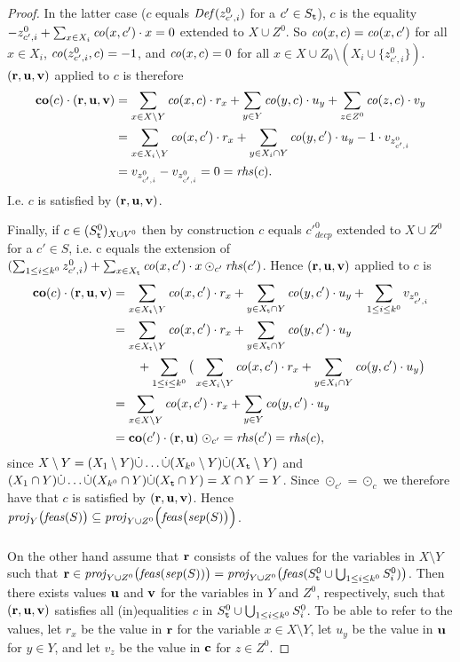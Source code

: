 \begin{proof}
In the latter case ($c$ equals $\mathit{Def}(z^0_{c',i})$ for a $c'\in S_{\texttt{t}}$), $c$ is the equality $-z^0_{c',i} + \sum_{x\in X_i}\mathit{co}(x,c')\cdot x = 0$ extended to $X\cup Z^0$. 
So $\mathit{co}(x,c) = \mathit{co}(x,c')$ for all $x\in X_i$, $\mathit{co}(z^0_{c',i}, c) = -1$, and $\mathit{co}(x,c) = 0$ for all $x\in X\cup Z_0\setminus (X_i\cup\{z^0_{c',i}\})$.
$(\mathbf{r},\mathbf{u},\mathbf{v})$ applied to $c$ is therefore
\begin{align*}
\mathbf{co}(c)\cdot(\mathbf{r},\mathbf{u},\mathbf{v})&=\sum_{x\in X\setminus Y}\mathit{co}(x,c)\cdot r_x + \sum_{y\in Y}\mathit{co}(y,c)\cdot u_y + \sum_{z\in Z^0}\mathit{co}(z,c)\cdot v_y\\
&= \sum_{x\in X_i\setminus Y}\mathit{co}(x,c')\cdot r_x + \sum_{y\in X_i\cap Y}\mathit{co}(y,c')\cdot u_y 
 -1\cdot v_{z^0_{c',i}}\\
&= v_{z^0_{c',i}} - v_{z^0_{c',i}} = 0 = \mathit{rhs}(c).
\end{align*}
I.e. $c$ is satisfied by $(\mathbf{r},\mathbf{u}, \mathbf{v})$. 

Finally, if $c\in (S^0_{\texttt{t}})_{X\cup V^0}$ then by construction $c$ equals $c'^0_{decp}$ extended to $X\cup Z^0$ for a $c'\in S$, i.e. c equals the extension of $(\sum_{1\leq i\leq k^0}z^0_{c',i}) + \sum_{x\in X_{\texttt{t}}}\mathit{co}(x,c')\cdot x\odot_{c'}\mathit{rhs}(c')$. Hence $(\mathbf{r},\mathbf{u}, \mathbf{v})$ applied to $c$ is
\begin{align*}
\mathbf{co}(c)\cdot(\mathbf{r},\mathbf{u}, \mathbf{v})
&= \sum_{x\in X_{\texttt{t}}\setminus Y}\mathit{co}(x,c')\cdot r_x + \sum_{y\in X_{\texttt{t}}\cap Y}\mathit{co}(y,c')\cdot u_y 
 +\sum_{1\leq i\leq k^0} v_{z^0_{c',i}}\\
&= \sum_{x\in X_{\texttt{t}}\setminus Y}\mathit{co}(x,c')\cdot r_x + \sum_{y\in X_{\texttt{t}}\cap Y}\mathit{co}(y,c')\cdot u_y\\ 
&\quad\quad + \sum_{1\leq i\leq k^0}\big(\sum_{x\in X_i\setminus Y}\mathit{co}(x,c')\cdot r_x + \sum_{y\in X_i\cap Y}\mathit{co}(y,c')\cdot u_y\big)\\
&= \sum_{x\in X\setminus Y}\mathit{co}(x,c')\cdot r_x + \sum_{y\in Y}\mathit{co}(y,c')\cdot u_y\\
&=\mathbf{co}(c')\cdot(\mathbf{r},\mathbf{u})\; \odot_{c'}= \mathit{rhs}(c') = \mathit{rhs}(c),
\end{align*}
since $X\setminus Y = (X_1\setminus Y)\dot\cup \ldots\dot\cup (X_{k^0}\setminus Y)\dot\cup (X_{\texttt{t}}\setminus Y)$ and
$(X_1\cap Y)\dot\cup \ldots\dot\cup (X_{k^0}\cap Y)\dot\cup (X_{\texttt{t}}\cap Y) = X\cap Y = Y$. Since $\odot_{c'}=\odot_c$ 
we therefore have that $c$ is satisfied by $(\mathbf{r},\mathbf{u}, \mathbf{v})$. Hence $\mathit{proj}_Y\big(\mathit{feas}(S)\big)\subseteq \mathit{proj}_{Y\cup Z^0}\Big(\mathit{feas}\big(\mathit{sep}(S)\big)\Big)$.
\\\\
On the other hand assume that $\mathbf{r}$ consists of the values for the variables in $X\setminus Y$ such that $\mathbf{r}\in \mathit{proj}_{Y\cup Z^0}\big(\mathit{feas}(\mathit{sep}(S))\big)=\mathit{proj}_{Y\cup Z^0}\big(\mathit{feas}(S^0_{\texttt{t}}\cup\bigcup_{1\leq i\leq k^0} S^0_i)\big)$. Then there exists values $\mathbf{u}$ and $\mathbf{v}$ for the variables in $Y$ and $Z^0$, respectively, such that $(\mathbf{r}, \mathbf{u}, \mathbf{v})$ satisfies all (in)equalities $c$ in $S^0_{\texttt{t}}\cup\bigcup_{1\leq i\leq k^0} S^0_i$. 
To be able to refer to the values, let $r_x$ be the value in $\mathbf{r}$ for the variable $x\in {X\setminus Y}$,
let $u_y$ be the value in $\mathbf{u}$ for $y\in Y$, and let $v_z$ be the value in $\mathbf{c}$ for $z\in Z^0$.


\end{proof}
